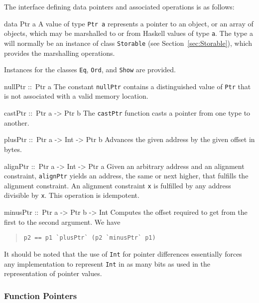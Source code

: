 \documentclass[a4paper,twosides]{article}
\makeatletter
\newcommand{\code}[1]{\texttt{#1}}      %
\newenvironment{codedesc}{%
  \list{}{\labelwidth\z@
    \let\makelabel\codedesclabel}
  }{%
  \endlist
  }
\newcommand*{\codedesclabel}[1]{%
  \hspace{-\leftmargin}
  \parbox[b]{\labelwidth}{\makebox[0pt][l]{\code{#1}}\\}\hfil\relax
  }
\makeatother
\begin{document}
The interface defining data pointers and associated operations is as follows:
%
\begin{codedesc}
\item[data Ptr a] A value of type \code{Ptr a} represents a pointer to an
  object, or an array of objects, which may be marshalled to or from Haskell
  values of type \code{a}.  The type a will normally be an instance of class
  \code{Storable} (see Section~\ref{sec:Storable}), which provides the
  marshalling operations.

  Instances for the classes \code{Eq}, \code{Ord}, and \code{Show} are
  provided. 
\item[nullPtr ::\ Ptr a] The constant \code{nullPtr} contains a distinguished
  value of \code{Ptr} that is not associated with a valid memory location.
\item[castPtr ::\ Ptr a -> Ptr b] The \code{castPtr} function casts a pointer
  from one type to another.
\item[plusPtr ::\ Ptr a -> Int -> Ptr b] Advances the given address by the
  given offset in bytes.
\item[alignPtr ::\ Ptr a -> Int -> Ptr a] Given an arbitrary address and an
  alignment constraint, \code{alignPtr} yields an address, the same or next
  higher, that fulfills the alignment constraint. An alignment constraint
  \code{x} is fulfilled by any address divisible by \code{x}. This operation
  is idempotent.
\item[minusPtr ::\ Ptr a -> Ptr b -> Int] Computes the offset required to get
  from the first to the second argument.  We have
  \begin{quote}
\begin{verbatim}
p2 == p1 `plusPtr` (p2 `minusPtr` p1)
\end{verbatim}
  \end{quote}
\end{codedesc}
%
It should be noted that the use of \code{Int} for pointer differences
essentially forces any implementation to represent \code{Int} in as many bits
as used in the representation of pointer values.

\subsubsection{Function Pointers}
\end{document}
